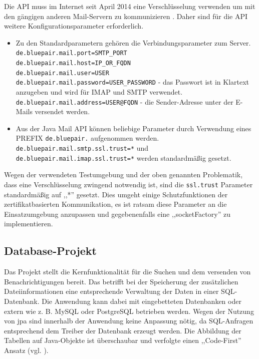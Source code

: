 \documentclass[oneside, ngerman, toc=bibliography,bibliography=totoc,listof=entryprefix, open=right,numbers=noenddot,fontsize=12pt]{scrbook}
\begin{document}
Die API muss im Internet seit April 2014 eine Verschlüsselung verwenden um mit den gängigen anderen Mail-Servern zu kommunizieren \cite{sslmail}. Daher sind für die API weitere Konfigurationsparameter erforderlich.
\label{javamailc}
\begin{itemize}
    \item Zu den Standardparametern gehören die Verbindungsparameter zum Server.\\
    \verb|de.bluepair.mail.port=SMTP_PORT|\\
    \verb|de.bluepair.mail.host=IP_OR_FQDN|\\
    \verb|de.bluepair.mail.user=USER|\\ \verb|de.bluepair.mail.password=USER_PASSWORD| - das Passwort ist in Klartext anzugeben und wird für IMAP und SMTP verwendet. \\
    \verb|de.bluepair.mail.address=USER@FQDN| - die Sender-Adresse unter der E-Mails versendet werden. 
    \item Aus der Java Mail API können beliebige Parameter  durch Verwendung eines PREFIX \verb|de.bluepair.| aufgenommen werden.
    \verb|de.bluepair.mail.smtp.ssl.trust=*| und\\
    \verb|de.bluepair.mail.imap.ssl.trust=*| werden standardmäßig gesetzt.
    
\end{itemize}

Wegen der verwendeten Testumgebung und der oben genannten Problematik, dass eine Verschlüsselung zwingend notwendig ist, sind die \verb|ssl.trust| Parameter standardmäßig auf ,,*'' gesetzt. Dies umgeht einige Schutzfunktionen der zertifikatbasierten Kommunikation, es ist ratsam diese Parameter an die Einsatzumgebung anzupassen und gegebenenfalls eine ,,socketFactory'' zu implementieren. 

\subsection{Database-Projekt}
Das Projekt stellt die Kernfunktionalität für die Suchen und dem versenden von Benachrichtigungen bereit.
Das betrifft bei der Speicherung der zusätzlichen Dateiinformationen eine entsprechende Verwaltung der Daten in einer SQL-Datenbank.
Die Anwendung kann dabei mit eingebetteten Datenbanken oder extern wie z. B. {MySQL} oder {PostgreSQL} betrieben werden.
Wegen der Nutzung von \acrshort{jpa} sind innerhalb der Anwendung keine Anpassung nötig, da SQL-Anfragen entsprechend dem Treiber der Datenbank erzeugt werden.
Die Abbildung der Tabellen auf Java-Objekte ist überschaubar und verfolgte einen ,,Code-First'' Ansatz (vgl. \cite{wincodefirst}). 
\end{document}
